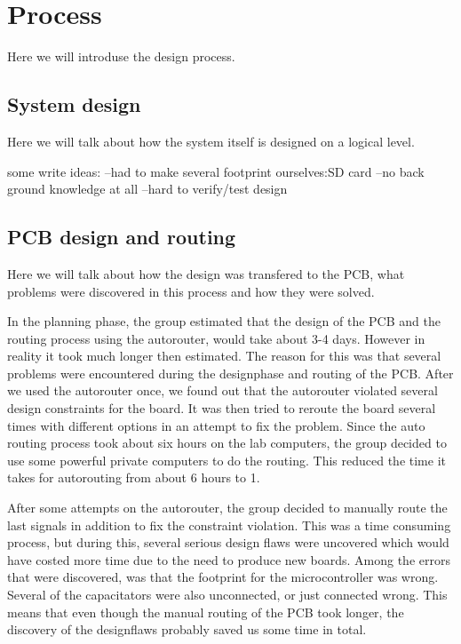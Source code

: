 \section {Process}

Here we will introduse the design process.

\subsection{System design} \label{pcb:process:ss:system_design}

Here we will talk about how the system itself is designed on a logical level.

some write ideas:
--had to make several footprint ourselves:SD card
--no back ground knowledge at all
--hard to verify/test design

\subsection{PCB design and routing} \label{pcb:process:ss:pcb_design_and_soldering}

Here we will talk about how the design was transfered to the PCB, what problems were discovered in this process and how they were solved.

In the planning phase, the group estimated that the design of the PCB and the routing process using the autorouter, would take about 3-4 days. However in reality it took much longer then estimated. The reason for this was that several
problems were encountered during the designphase and routing of the PCB. After we used the autorouter once, we found out that the autorouter violated several design constraints for the board. It was then tried to reroute the board several times
with different options in an attempt to fix the problem. Since the auto routing process took about six hours on the lab computers, the group decided to use some powerful private computers to do the routing. This reduced the time it takes for autorouting from about 6 hours to 1.

After some attempts on the autorouter, the group decided to manually route the last signals in addition to fix the constraint violation. This was a time consuming process, but during this, several serious design flaws were uncovered which would have costed
more time due to the need to produce new boards. Among the errors that were discovered, was that the footprint for the microcontroller was wrong. Several of the capacitators were also unconnected, or just connected wrong. This means that even though the manual routing of the PCB took longer,
the discovery of the designflaws probably saved us some time in total.
